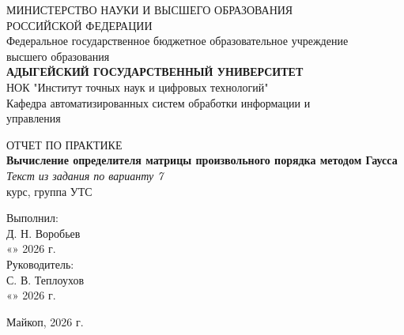 \documentclass[12pt,a4paper]{article}
\begin{document}
\pagestyle{empty}
\begin{center}
    
    {\fontsize{12pt}{14pt}\selectfont
        МИНИСТЕРСТВО НАУКИ И ВЫСШЕГО ОБРАЗОВАНИЯ\\
        РОССИЙСКОЙ ФЕДЕРАЦИИ\\
        Федеральное государственное бюджетное образовательное учреждение\\
        высшего образования\\
        \textbf{АДЫГЕЙСКИЙ ГОСУДАРСТВЕННЫЙ УНИВЕРСИТЕТ}\\
    }
    \vspace{0.3cm}
    {\fontsize{12pt}{14pt}\selectfont
        НОК "Институт точных наук и цифровых технологий"\\
        Кафедра автоматизированных систем обработки информации и\\
        управления\\
    }
\end{center}
\vspace{4.5cm}
\begin{center}
    
    {\fontsize{14pt}{16pt}\selectfont ОТЧЕТ ПО ПРАКТИКЕ\\}
    \vspace{0.5cm}
    {\fontsize{16pt}{18pt}\selectfont \textbf{Вычисление определителя матрицы произвольного порядка методом Гаусса}\\}
    {\fontsize{14pt}{16pt}\selectfont \textit{Текст из задания по варианту 7}\\}
    \vspace{0.8cm}
    {\fontsize{12pt}{14pt} курс, группа УТС\\}
\end{center}
\vspace{3cm}
\hfill
\begin{minipage}{0.48\textwidth}
    
    {\normalsize Выполнил:\\
    \underline{\hspace{3.5cm}} Д. Н. Воробьев\\
    «\underline{\hspace{0.8cm}}» \underline{\hspace{2.2cm}} 2026 г.\\
    \vspace{0.6cm}
    Руководитель:\\
    \underline{\hspace{3.5cm}} С. В. Теплоухов\\
    «\underline{\hspace{0.8cm}}» \underline{\hspace{2.2cm}} 2026 г.}
\end{minipage}
\vfill 
\begin{center}
    {\normalsize Майкоп, 2026 г.}
\end{center}
\newpage
\end{document}
